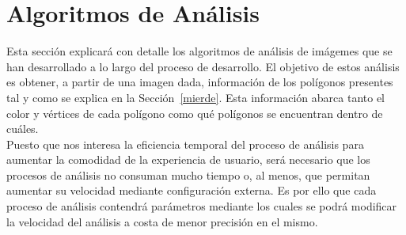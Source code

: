 \section{Algoritmos de Análisis}

Esta sección explicará con detalle los algoritmos de análisis de imágemes que se han desarrollado a lo largo del proceso de desarrollo. El objetivo de estos análisis es obtener, a partir de una imagen dada, información de los polígonos presentes tal y como se explica en la Sección~\ref{mierde}. Esta información abarca tanto el color y vértices de cada polígono como qué polígonos se encuentran dentro de cuáles.\\

Puesto que nos interesa la eficiencia temporal del proceso de análisis para aumentar la comodidad de la experiencia de usuario, será necesario que los procesos de análisis no consuman mucho tiempo o, al menos, que permitan aumentar su velocidad mediante configuración externa. Es por ello que cada proceso de análisis contendrá parámetros mediante los cuales se podrá modificar la velocidad del análisis a costa de menor precisión en el mismo.\\

